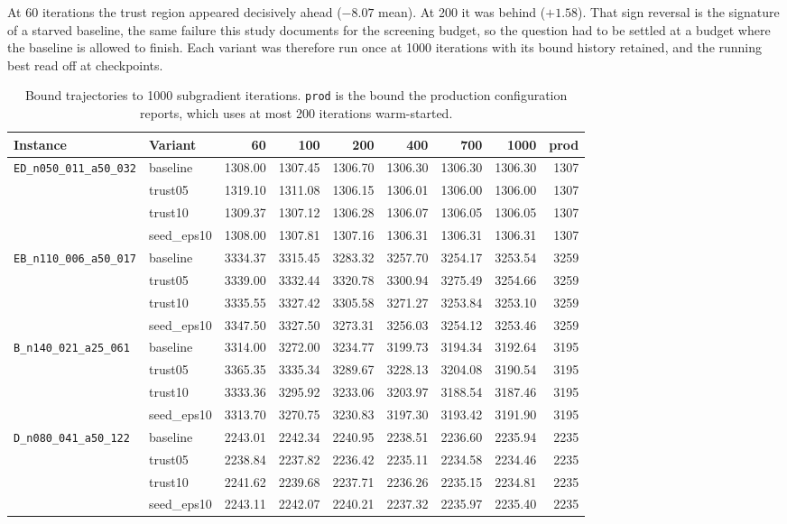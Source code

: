 At 60 iterations the trust region appeared decisively ahead ($-8.07$ mean). At 200 it was behind ($+1.58$). That sign reversal is the signature of a starved baseline, the same failure this study documents for the screening budget, so the question had to be settled at a budget where the baseline is allowed to finish. Each variant was therefore run once at 1000 iterations with its bound history retained, and the running best read off at checkpoints.

\begin{table}[htbp]
\centering
\caption{Bound trajectories to 1000 subgradient iterations. \texttt{prod} is the bound the production configuration reports, which uses at most 200 iterations warm-started.}
\label{tab:convergence}
\begin{tabular}{llrrrrrrr}
\toprule
Instance & Variant & 60 & 100 & 200 & 400 & 700 & 1000 & prod \\
\midrule
\texttt{ED\_n050\_011\_a50\_032} & baseline & 1308.00 & 1307.45 & 1306.70 & 1306.30 & 1306.30 & 1306.30 & 1307 \\
\texttt{} & trust05 & 1319.10 & 1311.08 & 1306.15 & 1306.01 & 1306.00 & 1306.00 & 1307 \\
\texttt{} & trust10 & 1309.37 & 1307.12 & 1306.28 & 1306.07 & 1306.05 & 1306.05 & 1307 \\
\texttt{} & seed\_eps10 & 1308.00 & 1307.81 & 1307.16 & 1306.31 & 1306.31 & 1306.31 & 1307 \\
\midrule
\texttt{EB\_n110\_006\_a50\_017} & baseline & 3334.37 & 3315.45 & 3283.32 & 3257.70 & 3254.17 & 3253.54 & 3259 \\
\texttt{} & trust05 & 3339.00 & 3332.44 & 3320.78 & 3300.94 & 3275.49 & 3254.66 & 3259 \\
\texttt{} & trust10 & 3335.55 & 3327.42 & 3305.58 & 3271.27 & 3253.84 & 3253.10 & 3259 \\
\texttt{} & seed\_eps10 & 3347.50 & 3327.50 & 3273.31 & 3256.03 & 3254.12 & 3253.46 & 3259 \\
\midrule
\texttt{B\_n140\_021\_a25\_061} & baseline & 3314.00 & 3272.00 & 3234.77 & 3199.73 & 3194.34 & 3192.64 & 3195 \\
\texttt{} & trust05 & 3365.35 & 3335.34 & 3289.67 & 3228.13 & 3204.08 & 3190.54 & 3195 \\
\texttt{} & trust10 & 3333.36 & 3295.92 & 3233.06 & 3203.97 & 3188.54 & 3187.46 & 3195 \\
\texttt{} & seed\_eps10 & 3313.70 & 3270.75 & 3230.83 & 3197.30 & 3193.42 & 3191.90 & 3195 \\
\midrule
\texttt{D\_n080\_041\_a50\_122} & baseline & 2243.01 & 2242.34 & 2240.95 & 2238.51 & 2236.60 & 2235.94 & 2235 \\
\texttt{} & trust05 & 2238.84 & 2237.82 & 2236.42 & 2235.11 & 2234.58 & 2234.46 & 2235 \\
\texttt{} & trust10 & 2241.62 & 2239.68 & 2237.71 & 2236.26 & 2235.15 & 2234.81 & 2235 \\
\texttt{} & seed\_eps10 & 2243.11 & 2242.07 & 2240.21 & 2237.32 & 2235.97 & 2235.40 & 2235 \\
\bottomrule
\end{tabular}
\end{table}

